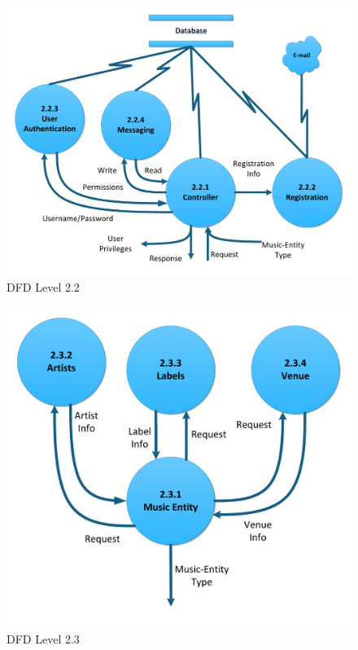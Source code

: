 \documentclass[letterpaper,12pt]{article}
\begin{document}
{\eject

\begin{figure}[h]
\centering
\includegraphics[scale=0.6]{DFD_level_2_2.pdf}
\caption{DFD Level 2.2}
\label{fig:DFD_level_2.2}
\end{figure}

\eject

\begin{figure}[h]
\centering
\includegraphics[scale=0.7]{DFD_level_2_3.pdf}
\caption{DFD Level 2.3}
\label{fig:DFD_level_2.3}
\end{figure}

}
\end{document}
